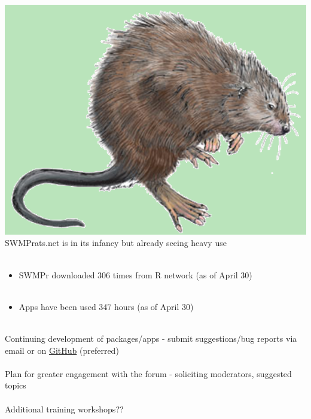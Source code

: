 \documentclass[serif]{beamer}\usepackage[]{graphicx}\usepackage[]{color}
\begin{document}
\begin{frame}[fragile]{\includegraphics[width=0.05\paperwidth]{fig/muskrat.png}\hspace{0.07in}{\bf Continuing work and engagement}}
SWMPrats.net is in its infancy but already seeing heavy use \\~\\
\begin{itemize}
\item SWMPr downloaded 306 times from R network (as of April 30) \\~\\
\item Apps have been used 347 hours (as of April 30) \\~\\
\end{itemize}
Continuing development of packages/apps - submit suggestions/bug reports via email or on \href{https://github.com/fawda123/SWMPr/issues}{GitHub} (preferred) \\~\\
Plan for greater engagement with the forum - soliciting moderators, suggested topics \\~\\
Additional training workshops??
\end{frame}
\end{document}
